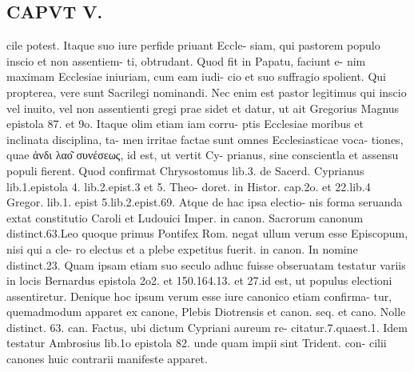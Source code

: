 \documentclass{article}
\begin{document}
\begin{pages}
\section*{CAPVT  V. }
\marginpar{[ p.35  ]}cile potest. Itaque suo iure perfide priuant Eccle- siam, qui pastorem populo inscio et non assentiem- ti, obtrudant. Quod fit in Papatu, faciunt e- nim maximam Ecclesiae iniuriam, cum eam iudi- cio et suo suffragio spolient. Qui propterea, vere sunt Sacrilegi nominandi. Nec enim est pastor legitimus qui inscio vel inuito, vel non assentienti gregi prae sidet et datur, ut ait Gregorius Magnus epistola 87. et 9o. Itaque olim etiam iam corru- ptis Ecclesiae moribus et inclinata disciplina, ta- men irritae factae sunt omnes Ecclesiasticae voca- tiones, quae ἀνδι λαο͂ συνέσεως, id est, ut vertit Cy- prianus, sine conscientla et assensu populi fierent. Quod confirmat Chrysostomus lib.3. de Sacerd. Cyprianus lib.1.epistola 4. lib.2.epist.3 et 5. Theo- doret. in Histor. cap.2o. et 22.lib.4 Gregor. lib.1. epist 5.lib.2.epist.69. Atque de hac ipsa electio- nis forma seruanda extat constitutio Caroli et Ludouici Imper. in canon. Sacrorum canonum distinct.63.Leo quoque primus Pontifex Rom. negat ullum verum esse Episcopum, nisi qui a cle- ro electus et a plebe expetitus fuerit. in canon. In nomine distinct.23. Quam ipsam etiam suo seculo adhuc fuisse obseruatam testatur variis in locis Bernardus epistola 2o2. et 150.164.13. et 27.id est, ut populus electioni assentiretur. Denique hoc ipsum verum esse iure canonico etiam confirma- tur, quemadmodum apparet ex canone, Plebis Diotrensis et canon. seq. et cano. Nolle distinct. 63. can. Factus, ubi dictum Cypriani aureum re- citatur.7.quaest.1. Idem testatur Ambrosius lib.1o epistola 82. unde quam impii sint Trident. con- cilii canones huic contrarii manifeste apparet. 

\end{pages}
\end{document}
